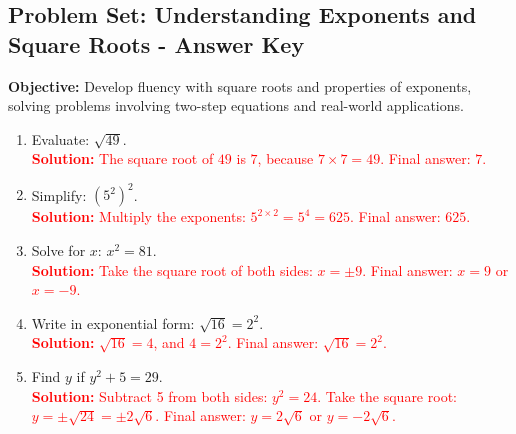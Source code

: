 \documentclass[10pt]{article}
\title{}
\date{}
\begin{document}
\subsection*{Problem Set: Understanding Exponents and Square Roots - Answer Key}
\onehalfspacing

\begin{tcolorbox}[colframe=black!40, colback=gray!5, 
coltitle=black, colbacktitle=black!20, fonttitle=\bfseries\Large, 
title=Learning Objective, halign title=center, left=5pt, right=5pt, top=5pt, bottom=15pt]
\textbf{Objective:} Develop fluency with square roots and properties of exponents, solving problems involving two-step equations and real-world applications.
\end{tcolorbox}
\begin{tcolorbox}[colframe=black!60, colback=white, 
coltitle=black, colbacktitle=black!15, fonttitle=\bfseries\Large, 
title=Exercises (Part 1), halign title=center, left=10pt, right=10pt, top=10pt, bottom=40pt]
\begin{enumerate}[itemsep=2.5em]
    \item Evaluate: \( \sqrt{49} \).\\
    \textcolor{red}{\textbf{Solution:} The square root of \(49\) is \(7\), because \(7 \times 7 = 49\). Final answer: \(7\).}

    \item Simplify: \( (5^2)^2 \).\\
    \textcolor{red}{\textbf{Solution:} Multiply the exponents: \(5^{2 \times 2} = 5^4 = 625\). Final answer: \(625\).}

    \item Solve for \(x\): \( x^2 = 81 \).\\
    \textcolor{red}{\textbf{Solution:} Take the square root of both sides: \(x = \pm 9\). Final answer: \(x = 9\) or \(x = -9\).}

    \item Write in exponential form: \( \sqrt{16} = 2^2 \).\\
    \textcolor{red}{\textbf{Solution:} \( \sqrt{16} = 4\), and \(4 = 2^2\). Final answer: \( \sqrt{16} = 2^2\).}

    \item Find \(y\) if \(y^2 + 5 = 29\).\\
    \textcolor{red}{\textbf{Solution:} Subtract 5 from both sides: \(y^2 = 24\). Take the square root: \(y = \pm \sqrt{24} = \pm 2\sqrt{6}\). Final answer: \(y = 2\sqrt{6}\) or \(y = -2\sqrt{6}\).}
\end{enumerate}
\end{tcolorbox}
\end{document}
